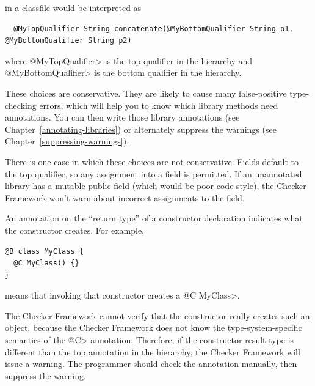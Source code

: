 \begin{itemize}
\noindent
in a classfile would be interpreted as

\begin{Verbatim}
  @MyTopQualifier String concatenate(@MyBottomQualifier String p1, @MyBottomQualifier String p2)
\end{Verbatim}

\noindent
where \<@MyTopQualifier> is the top qualifier in the hierarchy and
\<@MyBottomQualifier> is the bottom qualifier in the hierarchy.

These choices are conservative.  They are likely to cause many
false-positive type-checking errors, which will help you to know which
library methods need annotations.  You can then write those library
annotations (see Chapter~\ref{annotating-libraries}) or alternately
suppress the warnings (see Chapter~\ref{suppressing-warnings}).

There is one case in which these choices are not conservative.  Fields
default to the top qualifier, so any assignment into a field is permitted.
If an unannotated library has a mutable public field (which would be poor
code style), the Checker Framework won't warn about incorrect assignments
to the field.



\end{itemize}




An annotation on the ``return type'' of a constructor declaration indicates
what the constructor creates.  For example,

\begin{Verbatim}
@B class MyClass {
  @C MyClass() {}
}
\end{Verbatim}

\noindent
means that invoking that constructor creates a \<@C MyClass>.

The Checker Framework cannot verify that the constructor really creates
such an object, because the Checker Framework does not know the
type-system-specific semantics of the \<@C> annotation.
Therefore, if the constructor result type is different than the top annotation in the
hierarchy, the Checker Framework will issue a warning.
The programmer should check the annotation manually, then
suppress the warning.


